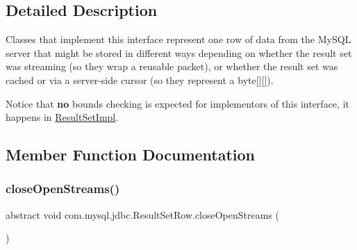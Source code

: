 \subsection{Detailed Description}
Classes that implement this interface represent one row of data from the My\+S\+QL server that might be stored in different ways depending on whether the result set was streaming (so they wrap a reusable packet), or whether the result set was cached or via a server-\/side cursor (so they represent a byte\mbox{[}\mbox{]}\mbox{[}\mbox{]}).

Notice that {\bfseries no} bounds checking is expected for implementors of this interface, it happens in \mbox{\hyperlink{classcom_1_1mysql_1_1jdbc_1_1_result_set_impl}{Result\+Set\+Impl}}. 

\subsection{Member Function Documentation}
\mbox{\label{classcom_1_1mysql_1_1jdbc_1_1_result_set_row_a54a6cea0cae63390d866d6ba7577912c}} 
\subsubsection{\texorpdfstring{close\+Open\+Streams()}{closeOpenStreams()}}
{\footnotesize\ttfamily abstract void com.\+mysql.\+jdbc.\+Result\+Set\+Row.\+close\+Open\+Streams (\begin{DoxyParamCaption}{ }\end{DoxyParamCaption})\hspace{0.3cm}{\ttfamily [abstract]}}

